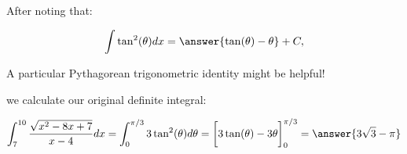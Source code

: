 \documentclass{ximera}
\begin{document}
\begin{exercise}
\begin{exercise}
\begin{exercise}
\begin{hint}
\end{hint}

After noting that:

\[
\int \tan^2(\theta) dx = \answer{\tan(\theta)-\theta}+C,
\]

\begin{hint}
A particular Pythagorean trigonometric identity might be helpful!
\end{hint}

we calculate our original definite integral: 

\[
\int_{7}^{10} \frac{\sqrt{x^{2}-8x+7}}{x-4} dx=\int_{0}^{\pi/3} 3\tan^{2}(\theta) d\theta= \bigg[3\tan(\theta)-3\theta\bigg]_0^{\pi/3} = \answer{3\sqrt{3}-\pi}
\]


\end{exercise}
\end{exercise}
\end{exercise}
\end{document}

